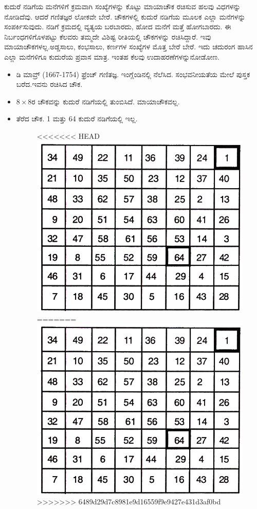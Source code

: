 ಕುದುರೆ ನಡಿಗೆಯ ಮನೆಗಳಿಗೆ ಕ್ರಮವಾಗಿ ಸಂಖ್ಯೆಗಳನ್ನು ಕೊಟ್ಟು ಮಾಯಾಚೌಕ ರಚಿಸುವ ಹಲವು ವಿಧಗಳನ್ನು ನೋಡಿದೆವು. ಆದರೆ ಗಣಿತಜ್ಞರ ಲೋಕವೇ ಬೇರೆ. ಚೌಕಗಳಲ್ಲಿ ಕುದುರೆ\- ನಡಿಗೆಯ ಮೂಲಕ ಎಲ್ಲಾ ಮನೆಗಳನ್ನು ಸಂಪರ್ಕಿಸುವುದು. ನಡಿಗೆ ಕ್ರಮದಲ್ಲಿ ವ್ಯತ್ಯಯ ಬರಬಾರದು, ಹೋದ ಮನೆಗೆ ಮತ್ತೆ ಹೋಗಬಾರದು. ಈ ನಿರ್ಬಂಧಗಳಿಗೊಳಪಟ್ಟು ಕೆಲವರು ತಮ್ಮದೇ ವಿಶಿಷ್ಟ ರೀತಿಯಲ್ಲಿ ಚೌಕಗಳನ್ನು ರಚಿಸಿದ್ದಾರೆ. ಇವು ಮಾಯಾಚೌಕಗಳಲ್ಲ.\break ಅಡ್ಡಸಾಲು, ಕಂಭಸಾಲು, ಕರ್ಣಗಳ ಸಂಖ್ಯೆಗಳ ಮೊತ್ತ ಬೇರೆ ಬೇರೆ. ಇದು ಚದುರಂಗ ಹಾಸಿನ\- ಎಲ್ಲಾ ಮನೆಗಳಿಗೂ ಕುದುರೆಯ ಪ್ರವಾಸ ಮಾತ್ರ. ಇಂತಹ ಕೆಲವು ಉದಾಹರಣೆಗಳನ್ನು\break ನೋಡೋಣ.
\begin{itemize}
	\item ಡಿ ಮಾವ್ರ್ (1667-1754) ಫ್ರೆಂಚ್ ಗಣಿತಜ್ಞ. ಇಂಗ್ಲೆಂಡಿನಲ್ಲಿ ನೆಲೆಸಿದ. ಸಂಭವನೀಯತೆಯ ಮೇಲೆ ಪುಸ್ತಕ ಬರೆದ.ಇವನು ರಚಿಸಿದ ಚೌಕ.
	\item $8 \times 8$ರ ಚೌಕವನ್ನು ಕುದುರೆ ನಡಿಗೆಯಲ್ಲಿ ತುಂಬಿಸಿದೆ. ಮಾಯಾಚೌಕವಲ್ಲ.
	\item ತೆರೆದ ಚೌಕ. 1 ಮತ್ತು 64 ಕುದುರೆ ನಡಿಗೆಯಲ್ಲಿ ಇಲ್ಲ.
	\begin{figure}[H]
<<<<<<< HEAD
	\includegraphics{src/figures/chap6/fig6-8.jpg}
=======
	\includegraphics[scale=0.85]{src/figures/chap6/fig6.8.jpg}
>>>>>>> 6489d29d7c8981e9d16559f9e9427e431d3af0bd
	\end{figure}


\end{itemize}
